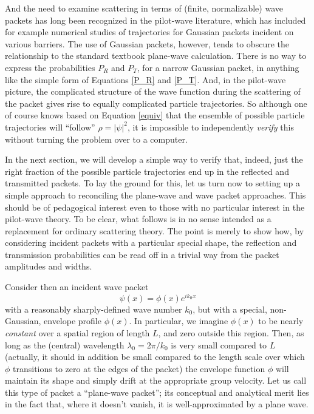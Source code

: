 \documentclass[aps,prc,twocolumn,letterpaper,floatfix]{revtex4}
\begin{document}
And the need to examine scattering in terms of (finite, normalizable) 
wave packets has long been recognized in the pilot-wave literature,
which has included for example numerical studies of trajectories for
Gaussian packets incident on various barriers.  \cite{dh,uu,holland}
The use of Gaussian
packets, however, tends to obscure the relationship to the standard
textbook plane-wave calculation.  There is no way to express the
probabilities $P_R$
and $P_T$, for a narrow Gaussian packet, in anything like the
simple form of Equations \eqref{P_R} and \eqref{P_T}.  
And, in the
pilot-wave picture, the complicated structure of the wave function
during the scattering of the packet gives rise to equally complicated 
particle trajectories.  So although one of course knows based on
Equation \eqref{equiv} that the ensemble of possible particle trajectories will
``follow'' $\rho = |\psi|^2$, it is impossible to independently
\emph{verify} this without turning the problem over to a computer.

In the next section, we will develop a simple way to verify that,
indeed, just the right fraction of the possible particle trajectories
end up in the reflected and transmitted packets.  To lay the ground
for this, let us turn now to setting up a simple approach
to reconciling the plane-wave and wave packet approaches.
This should
be of pedagogical interest even to those with no particular interest
in the pilot-wave theory.  To be clear, what follows is in no sense
intended as a replacement for ordinary scattering
theory. \cite{scattering}  The point
is merely to show how, by considering incident packets with a
particular special shape, the reflection and transmission
probabilities can be read off in a trivial way from the packet
amplitudes and widths. 

Consider then an incident wave packet
\begin{equation}
\psi(x) = \phi(x) e^{i k_0 x}
\end{equation}
with a reasonably sharply-defined wave number $k_0$, but with a
special, non-Gaussian, envelope profile $\phi(x)$.  In particular, we
imagine $\phi(x)$ to be nearly \emph{constant} over a spatial region
of length $L$, and zero outside this region.  Then, as long as the
(central) wavelength $\lambda_0 = 2 \pi / k_0$ is very small compared to
$L$ (actually, it should in addition be small compared to the length
scale over which $\phi$ transitions to zero at the edges of the
packet) the envelope function $\phi$ will maintain its shape and
simply drift at the appropriate group velocity.  Let us call this type
of packet a ``plane-wave packet''; its conceptual and analytical merit
lies in the fact that, where it doesn't vanish, it is
well-approximated by a plane wave.  \cite{planewave}
\end{document}
